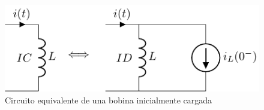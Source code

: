 \documentclass[11pt]{book} %
\begin{document}
	\begin{figure}[htbp]
	    \centering
	    \includegraphics{../figs/condiciones_iniciales_L.pdf}
	    \caption{Circuito equivalente de una bobina inicialmente cargada}
	    \label{fig.condiciones_iniciales_L}
	\end{figure}
	
	
\end{document}
